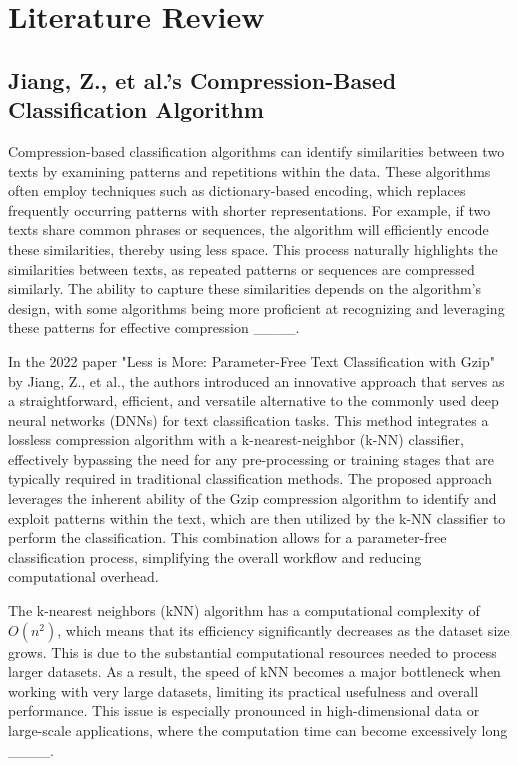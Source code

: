 \section{Literature Review}
\subsection{Jiang, Z., et al.’s Compression-Based Classification Algorithm}

Compression-based classification algorithms can identify similarities between two texts by examining patterns and repetitions within the data. These algorithms often employ techniques such as dictionary-based encoding, which replaces frequently occurring patterns with shorter representations. For example, if two texts share common phrases or sequences, the algorithm will efficiently encode these similarities, thereby using less space. This process naturally highlights the similarities between texts, as repeated patterns or sequences are compressed similarly. The ability to capture these similarities depends on the algorithm's design, with some algorithms being more proficient at recognizing and leveraging these patterns for effective compression ____.

In the 2022 paper "Less is More: Parameter-Free Text Classification with Gzip" by Jiang, Z., et al., the authors introduced an innovative approach that serves as a straightforward, efficient, and versatile alternative to the commonly used deep neural networks (DNNs) for text classification tasks. This method integrates a lossless compression algorithm with a k-nearest-neighbor (k-NN) classifier, effectively bypassing the need for any pre-processing or training stages that are typically required in traditional classification methods. The proposed approach leverages the inherent ability of the Gzip compression algorithm to identify and exploit patterns within the text, which are then utilized by the k-NN classifier to perform the classification. This combination allows for a parameter-free classification process, simplifying the overall workflow and reducing computational overhead.

The k-nearest neighbors (kNN) algorithm has a computational complexity of  \(O(n^2)\), which means that its efficiency significantly decreases as the dataset size grows. This is due to the substantial computational resources needed to process larger datasets. As a result, the speed of kNN becomes a major bottleneck when working with very large datasets, limiting its practical usefulness and overall performance. This issue is especially pronounced in high-dimensional data or large-scale applications, where the computation time can become excessively long ____.

